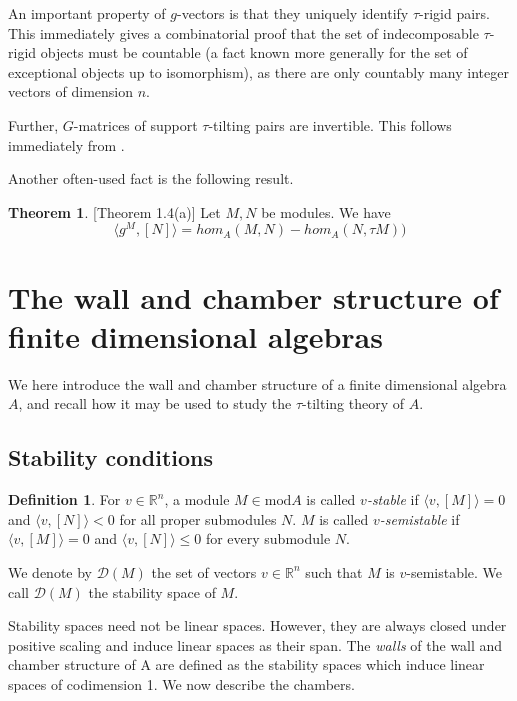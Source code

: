 \documentclass[]{article}
\theoremstyle{definition}
\newtheorem{definition}{Definition}[section]
\newtheorem{theorem}{Theorem}[section]
\newcommand{\tu}{\ensuremath{\tau}}
\begin{document}
An important property of $g$-vectors is that they uniquely identify $\tau$-rigid pairs\cite[Theorem 5.5]{tau}. This immediately gives a combinatorial proof that the set of indecomposable \tu-rigid objects must be countable (a fact known more generally for the set of exceptional objects up to isomorphism), as there are only countably many integer vectors of dimension $n$. 

Further, $G$-matrices of support \tu-tilting pairs are invertible. This follows immediately from \cite[Theorem 5.1]{tau}.

Another often-used fact is the following result.

\begin{theorem}\cite{auslander1985modules}[Theorem 1.4(a)]
	Let $M,N$ be modules. We have \[\langle g^M,[N]\rangle = hom_A(M,N) - hom_A(N,\tau M))\]
\end{theorem}

\section{The wall and chamber structure of finite dimensional algebras}
We here introduce the wall and chamber structure of a finite dimensional algebra $A$, and recall how it may be used to study the \tu-tilting theory of $A$.

\subsection{Stability conditions}

\begin{definition}
	For $v \in \mathbb{R}^n$, a module $M \in \text{mod} A$ is called \textit{$v$-stable} if $\langle v,[M]\rangle = 0$ and $\langle v,[N]\rangle < 0$ for all proper submodules $N$. $M$ is called \textit{$v$-semistable} if $\langle v, [M]\rangle = 0$ and $\langle v, [N]\rangle \leq 0$ for every submodule $N$.
\end{definition}

We denote by $\mathcal{D}(M)$ the set of vectors $v \in \mathbb{R}^n$ such that $M$ is $v$-semistable. We call $\mathcal{D}(M)$ the stability space of $M$.


Stability spaces need not be linear spaces. However, they are always closed under positive scaling and induce linear spaces as their span. The \textit{walls} of the wall and chamber structure of A are defined as the stability spaces which induce linear spaces of codimension 1. We now describe the chambers.
\end{document}
